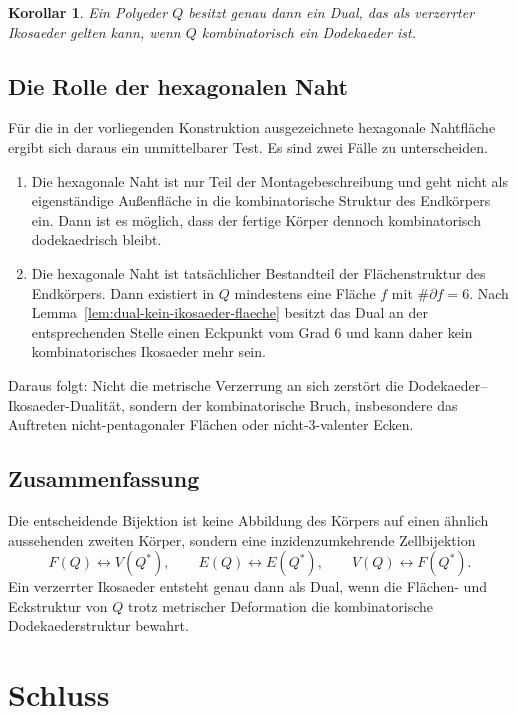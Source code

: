 \documentclass[11pt]{article}
\theoremstyle{plain}
\newtheorem{korollar}[satz]{Korollar}
\theoremstyle{definition}
\theoremstyle{remark}
\begin{document}
	\begin{korollar}
		Ein Polyeder \(Q\) besitzt genau dann ein Dual, das als verzerrter Ikosaeder gelten kann, wenn \(Q\) kombinatorisch ein Dodekaeder ist.
	\end{korollar}
	
	\subsection{Die Rolle der hexagonalen Naht}
	
	Für die in der vorliegenden Konstruktion ausgezeichnete hexagonale Nahtfläche ergibt sich daraus ein unmittelbarer Test. Es sind zwei Fälle zu unterscheiden.
	
	\begin{enumerate}
		\item Die hexagonale Naht ist nur Teil der Montagebeschreibung und geht nicht als eigenständige Außenfläche in die kombinatorische Struktur des Endkörpers ein. Dann ist es möglich, dass der fertige Körper dennoch kombinatorisch dodekaedrisch bleibt.
		\item Die hexagonale Naht ist tatsächlicher Bestandteil der Flächenstruktur des Endkörpers. Dann existiert in \(Q\) mindestens eine Fläche \(f\) mit \(\#\partial f=6\). Nach Lemma~\ref{lem:dual-kein-ikosaeder-flaeche} besitzt das Dual an der entsprechenden Stelle einen Eckpunkt vom Grad \(6\) und kann daher kein kombinatorisches Ikosaeder mehr sein.
	\end{enumerate}
	
	Daraus folgt: Nicht die metrische Verzerrung an sich zerstört die Dodekaeder--Ikosaeder-Dualität, sondern der kombinatorische Bruch, insbesondere das Auftreten nicht-pentagonaler Flächen oder nicht-\(3\)-valenter Ecken.
	
	\subsection{Zusammenfassung}
	
	Die entscheidende Bijektion ist keine Abbildung des Körpers auf einen ähnlich aussehenden zweiten Körper, sondern eine inzidenzumkehrende Zellbijektion
	\[
	F(Q)\leftrightarrow V(Q^\ast),\qquad
	E(Q)\leftrightarrow E(Q^\ast),\qquad
	V(Q)\leftrightarrow F(Q^\ast).
	\]
	Ein verzerrter Ikosaeder entsteht genau dann als Dual, wenn die Flächen- und Eckstruktur von \(Q\) trotz metrischer Deformation die kombinatorische Dodekaederstruktur bewahrt.
	
	\section{Schluss}
	
\end{document}
